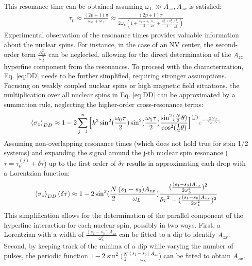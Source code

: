 \documentclass[%
 reprint,
superscriptaddress,
 amsmath,amssymb,
 aps,
]{revtex4-2}
\begin{document}
This resonance time can be obtained assuming $\omega_L \gg A_{zz}, A_{zx}$ is satisfied: 
\begin{gather} \label{eq:resonance}
	\tau_p \approx  \frac{(2p+1) \pi}{\omega_0 + \omega_1} \approx \frac{(2p+1)\pi}{2\omega_L(1+\frac{s_0+s_1}{2} \frac{A_{zz}}{\omega_L}+ \frac{s_0^2+s_1^2}{4}\frac{A_{zx}^2}{\omega_L^2})}
\end{gather}
Experimental observation of the resonance times provides valuable information about the nuclear spins.
For instance, in the case of an NV center, the second-order term $\frac{A_{zx}^2}{\omega_L^2}$ can be neglected, allowing for the direct determination of the $A_{zz}$ hyperfine component from the resonances.
To proceed with the characterization, Eq. \ref{eq:DD} needs to be further simplified, requiring stronger assumptions.
Focusing on weakly coupled nuclear spins or high magnetic field situations, the multiplication over all nuclear spins in Eq. \ref{eq:DD} can be approximated by a summation rule, neglecting the higher-order cross-resonance terms:
\small
\begin{gather}
	\expval{\sigma_z}_{DD} \approx 1 -2
	\sum_{j=1}^n \Big[ k^2 	 \sin^2(\frac{\omega_0 \tau}{2}) \sin^2(\frac{\omega_1 \tau}{2}) \frac{\sin^2(\frac{N}{2} \theta)}{\cos^2(\frac{1}{2}\theta)}  \Big]^{(j)} \textcolor{gray}{ e^{-\frac{2N\tau}{T_2(N)}}}
	\label{eq:approx_DD}
\end{gather}
\normalsize
Assuming non-overlapping resonance times (which does not hold true for spin 1/2 systems) and expanding the signal around the j-th nuclear spin resonance ($\tau = \tau_p^{(j)}+\delta \tau$) up to the first order of $\delta \tau$ results in approximating each drop with a Lorentzian function:
\small
\begin{gather}
	\expval{\sigma_z}_{DD} (\delta \tau ) \approx 1 -2\sin^2(\frac{N}{2}\frac{(s_1-s_0)A_{zx}}{\omega_L}) \frac{(\frac{(s_1-s_0)A_{zx}}{2\omega_L^2})^2}{{\delta \tau}^2 +(\frac{(s_1-s_0)A_{zx}}{2\omega_L^2})^2}
\end{gather}
\normalsize
This simplification allows for the determination of the parallel component of the hyperfine interaction for each nuclear spin, possibly in two ways. First, a Lorentzian with a width of $\frac{(s_1-s_0) A_{zx}}{\omega_L^2}$ can be fitted to a dip to identify $A_{zx}$. Second, by keeping track of the minima of a dip while varying the number of pulses, the periodic function $1 - 2 \sin^2\big(\frac{N}{2}\frac{(s_1-s_0) A_{zx}}{\omega_L}\big)$ can be fitted to obtain $A_{zx}$.
\end{document}
